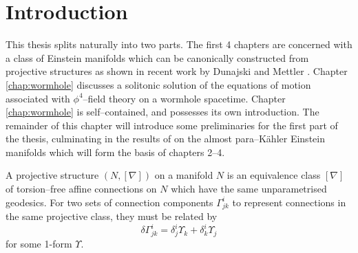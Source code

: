 

\chapter{Introduction}\label{chap:intro}


This thesis splits naturally into two parts. The first 4 chapters are concerned with a class of Einstein manifolds which can be canonically constructed from projective structures as shown in recent work by Dunajski and Mettler \cite{DM}. Chapter \ref{chap:wormhole} discusses a solitonic solution of the equations of motion associated with $\phi^4$--field theory on a wormhole spacetime. Chapter \ref{chap:wormhole} is self--contained, and possesses its own introduction. The remainder of this chapter will introduce some preliminaries for the first part of the thesis, culminating in the results of \cite{DM} on the almost para--K\"ahler Einstein manifolds which will form the basis of chapters 2--4.




\begin{defi} A projective structure $(N,[\nabla])$
on a manifold $N$ is an equivalence class $[\nabla]$ of torsion--free affine connections
on $N$ which have the same unparametrised geodesics. For two sets
of connection components $\Gamma_{jk}^{i}$ to represent connections
in the same projective class, they must be related by
\begin{equation}
\delta\Gamma_{jk}^{i}=\delta_{j}^{i}\Upsilon_{k}+\delta_{k}^{i}\Upsilon_{j}\label{eq:proj_change}
\end{equation}
for some 1-form $\Upsilon.$
\end{defi}

